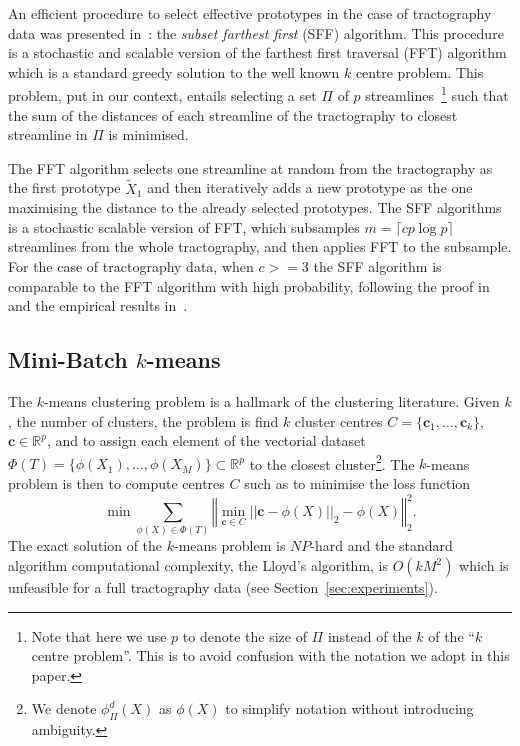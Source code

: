 An efficient procedure to select effective prototypes in the case of
tractography data was presented in~\cite{olivetti2012approximation}:
the \emph{subset farthest first} (SFF) algorithm. This procedure is a
stochastic and scalable version of the farthest first traversal (FFT)
algorithm which is a standard greedy solution to the well known $k$
centre problem. This problem, put in our context, entails selecting a
set $\Pi$ of $p$ streamlines~\footnote{Note that here we use $p$ to
  denote the size of $\Pi$ instead of the $k$ of the ``$k$ centre
  problem''. This is to avoid confusion with the notation we adopt in
  this paper.} such that the sum of the distances of each streamline
of the tractography to closest streamline in $\Pi$ is minimised.

The FFT algorithm selects one streamline at random from the
tractography as the first prototype $\tilde{X}_1$ and then iteratively
adds a new prototype as the one maximising the distance to the already
selected prototypes. The SFF algorithms is a stochastic scalable
version of FFT, which subsamples $m = \lceil c p \log p \rceil$
streamlines from the whole tractography, and then applies FFT to the
subsample. For the case of tractography data, when $c>=3$ the SFF
algorithm is comparable to the FFT algorithm with high probability,
following the proof in~\cite{turnbull2005fast} and the empirical
results in~\cite{olivetti2012approximation}.


\subsection{Mini-Batch $k$-means}
\label{sec:mbkm}
The $k$-means clustering problem is a hallmark of the clustering
literature. Given $k$, the number of clusters, the problem is find $k$
cluster centres $C = \{\mathbf{c}_1,\ldots,\mathbf{c}_k\}$,
$\mathbf{c} \in \mathbb{R}^p$, and to assign each element of the
vectorial dataset $\Phi(T) = \{\phi(X_1),\ldots,\phi(X_M)\} \subset
\mathbb{R}^p$ to the closest cluster\footnote{We denote
  $\phi_{\Pi}^d(X)$ as $\phi(X)$ to simplify notation without
  introducing ambiguity.}. The $k$-means problem is then to compute
centres $C$ such as to minimise the loss function
\begin{equation}
  \label{eq:kmeans_loss}
  \min \sum_{\phi(X) \in \Phi(T)}\left\Vert\min_{\mathbf{c} \in C}||\mathbf{c}
  - \phi(X)||_2 - \phi(X)\right\Vert_2^2.
\end{equation}
The exact solution of the $k$-means problem is $NP$-hard and the
standard algorithm computational complexity, the Lloyd's algorithm, is
$O(kM^2)$ which is unfeasible for a full tractography data (see
Section~\ref{sec:experiments}).

